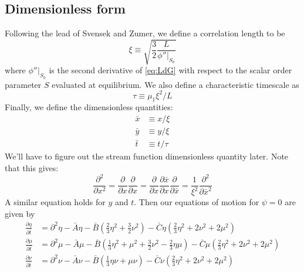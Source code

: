 \documentclass[reqno]{article}
\begin{document}
	\subsection{Dimensionless form}
	Following the lead of Svensek and Zumer, we define a correlation length to be
	\begin{equation}
		\xi \equiv \sqrt{\frac32 \frac{L}{\left.\phi''\right|_{S_0}}}
	\end{equation}
	where $\left.\phi''\right|_{S_0}$ is the second derivative of \eqref{eq:LdG} with respect to the scalar order parameter $S$ evaluated at equilibrium. We also define a characteristic timescale as
	\begin{equation}\label{eq:tau}
		\tau \equiv \mu_1 \xi^2/L
	\end{equation}
	Finally, we define the dimensionless quantities:
	\begin{align}
		\bar{x} &\equiv x/\xi \\
		\bar{y} &\equiv y/\xi \\
		\bar{t} &\equiv t/\tau 
	\end{align}
	We'll have to figure out the stream function dimensionless quantity later. Note that this gives:
	\begin{equation}
		\frac{\partial^2}{\partial x^2} = \frac{\partial}{\partial x}\frac{\partial}{\partial x} = \frac{\partial}{\partial x} \frac{\partial \bar{x}}{\partial x} \frac{\partial}{\partial \bar{x}} = \frac{1}{\xi^2}\frac{\partial^2}{\partial \bar{x}^2}
	\end{equation}
	A similar equation holds for $y$ and $t$. Then our equations of motion for $\psi = 0$ are given by
	\begin{equation}\label{eq:dimensionless-eoms}
	\begin{split}
		\frac{\partial \eta}{\partial \bar{t}} &= \partial^2 \eta - \bar{A}\eta - \bar{B}\left( \tfrac 23 \eta^2 + \tfrac 32 \nu^2\right) - \bar{C} \eta \left( \tfrac23 \eta^2 + 2\nu^2 + 2\mu^2\right) \\
		\frac{\partial \mu}{\partial \bar{t}} &= \partial^2 \mu - \bar{A}\mu - \bar{B}\left( \tfrac13 \eta^2 + \mu^2 + \tfrac32 \nu^2 - \tfrac23 \eta \mu \right) - \bar{C}\mu\left(\tfrac23 \eta^2 + 2\nu^2 + 2\mu^2\right) \\
		\frac{\partial \nu}{\partial \bar{t}} &= \partial^2 \nu - \bar{A}\nu - \bar{B}\left( \tfrac13\eta\nu + \mu\nu \right) - \bar{C}\nu\left(\tfrac23\eta^2 + 2\nu^2 + 2\mu^2\right)
	\end{split}
	\end{equation}
\end{document}
